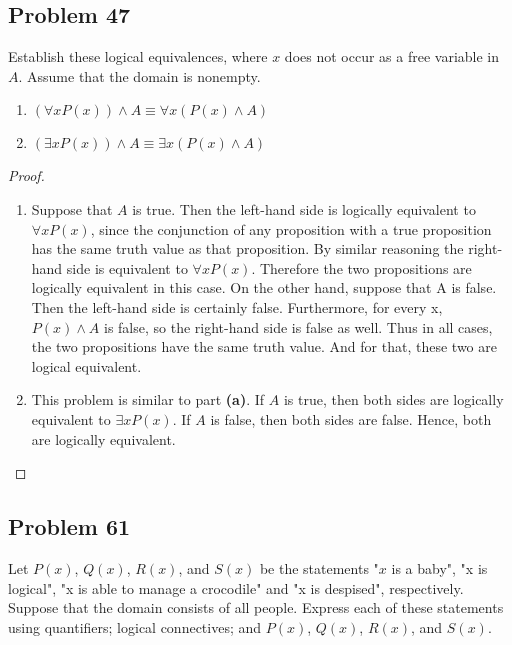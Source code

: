\documentclass{article}
\begin{document}
\clearpage
\subsection*{Problem 47}
Establish these logical equivalences, where $x$ does not occur as a free variable in $A$. Assume that the domain is nonempty.

\begin{enumerate}[leftmargin=16pt, topsep = 8pt]
\item $(\forall xP(x)) \land A \equiv \forall x(P(x) \land A)$
\item $(\exists xP(x)) \land A \equiv \exists x(P(x) \land A)$
\end{enumerate}

\begin{proof}
\hspace{1pt}

\begin{enumerate}[leftmargin=16pt, topsep = 8pt]
\item Suppose that $A$ is true. Then the left-hand side is logically equivalent to $\forall xP(x)$, since the conjunction of any proposition with a true proposition has the same truth value as that proposition. By similar reasoning the right-hand side is equivalent to $\forall xP(x)$. Therefore the two propositions are logically equivalent in this case. On the other hand, suppose that A is false. Then the left-hand side is certainly false. Furthermore, for every x, $P(x) \land A$ is false, so the right-hand side is false as well. Thus in all cases, the two propositions have the same truth value. And for that, these two are logical equivalent.
\item This problem is similar to part \textbf{(a)}. If $A$ is true, then both sides are logically equivalent to $\exists xP(x)$. If $A$ is false, then both sides are false. Hence, both are logically equivalent.
\end{enumerate}
\end{proof}

\clearpage
\subsection*{Problem 61}
Let $P(x)$, $Q(x)$, $R(x)$, and $S(x)$ be the statements "$x$ is a baby", "x is logical", "x is able to manage a crocodile" and "x is despised", respectively. Suppose that the domain consists of all people. Express each of these statements using quantifiers; logical connectives; and $P(x)$, $Q(x)$, $R(x)$, and $S(x)$.
\end{document}
